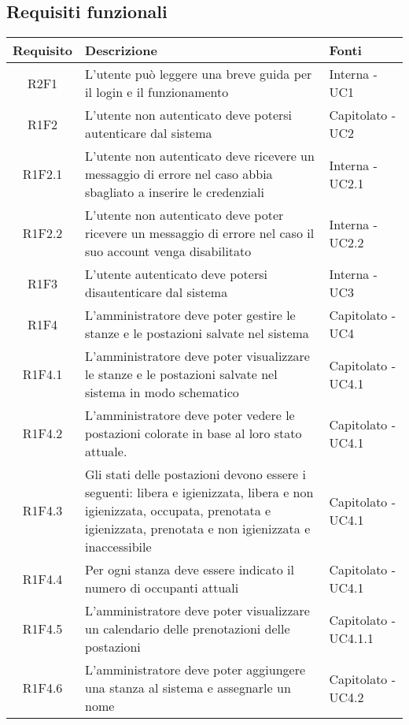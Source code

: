 \subsection{Requisiti funzionali}
\begin{center}
	\begin{longtable}{|c|p{10cm}|p{4cm}|}
		\hline
		\rowcolor{lighter-grayer}
		\textbf{Requisito} & \textbf{Descrizione} & \textbf{Fonti}  \\
		\hline
		\endhead
		
		 R2F1 & L'utente può leggere una breve guida per il login e il funzionamento & Interna - UC1 \\
		\hline
		R1F2	&	L'utente non autenticato deve potersi autenticare dal sistema& Capitolato - UC2	\\
		\hline
		R1F2.1	&	L'utente non autenticato deve ricevere un messaggio di errore nel caso abbia sbagliato a inserire le credenziali& Interna - UC2.1	\\
		\hline
		R1F2.2	&	L'utente non autenticato deve poter ricevere un messaggio di errore nel caso il suo account venga disabilitato& Interna - UC2.2	\\
		\hline
		R1F3	&	L'utente autenticato deve potersi disautenticare dal sistema& Interna - UC3	\\
		\hline
			R1F4&L'amministratore deve poter gestire le stanze e le postazioni salvate nel sistema	& Capitolato - UC4	\\
					\hline
			R1F4.1&L'amministratore deve poter visualizzare le stanze e le postazioni salvate nel sistema in modo schematico	& Capitolato - UC4.1	\\
					\hline
			R1F4.2&	L'amministratore deve poter vedere le postazioni colorate in base al loro stato attuale.& Capitolato - UC4.1	\\
					\hline
			R1F4.3&	Gli stati delle postazioni devono essere i seguenti: libera e igienizzata, libera e non igienizzata, occupata, prenotata e igienizzata, prenotata e non igienizzata e inaccessibile& 	Capitolato - UC4.1\\
					\hline
			R1F4.4&Per ogni stanza deve essere indicato il numero di occupanti attuali	& Capitolato - UC4.1	\\
					\hline
			R1F4.5&L'amministratore deve poter visualizzare un calendario delle prenotazioni delle postazioni	& Capitolato - UC4.1.1	\\
					\hline
				R1F4.6&L'amministratore deve poter aggiungere una stanza al sistema e assegnarle un nome	& Capitolato - UC4.2	\\

\end{longtable}
\end{center}
